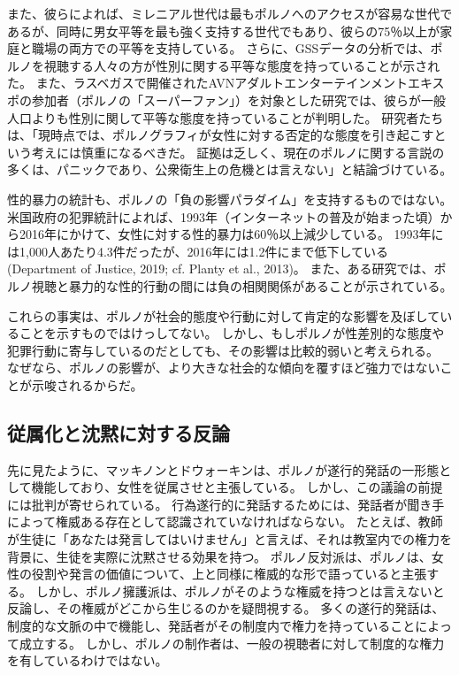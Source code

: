 \documentclass[paper=a4,book,openany]{jlreq}
\begin{document}
また、彼らによれば、ミレニアル世代は最もポルノへのアクセスが容易な世代であるが、同時に男女平等を最も強く支持する世代でもあり、彼らの75％以上が家庭と職場の両方での平等を支持している。
さらに、GSSデータの分析では、ポルノを視聴する人々の方が性別に関する平等な態度を持っていることが示された\citep{taylor16:_is_pornog_reall_makin_hate_women}。
また、ラスベガスで開催されたAVNアダルトエンターテインメントエキスポの参加者（ポルノの「スーパーファン」）を対象とした研究では、彼らが一般人口よりも性別に関して平等な態度を持っていることが判明した\citep{jackson19:_expos_mens_gender_role_attit_porn_super}。
研究者たちは、「現時点では、ポルノグラフィが女性に対する否定的な態度を引き起こすという考えには慎重になるべきだ。
証拠は乏しく、現在のポルノに関する言説の多くは、パニックであり、公衆衛生上の危機とは言えない」と結論づけている\citep{maginn19:_how_male_porn_super_reall_view_women}。

性的暴力の統計も、ポルノの「負の影響パラダイム」を支持するものではない。
米国政府の犯罪統計によれば、1993年（インターネットの普及が始まった頃）から2016年にかけて、女性に対する性的暴力は60％以上減少している。
1993年には1,000人あたり4.3件だったが、2016年には1.2件にまで低下している(Department of Justice, 2019; cf. Planty et al., 2013)。
\nocite{department19:_nation_crime_victim_survey}
また、ある研究では、ポルノ視聴と暴力的な性的行動の間には負の相関関係があることが示されている\citep{ferguson09:_pleas_is_momen}。

これらの事実は、ポルノが社会的態度や行動に対して肯定的な影響を及ぼしていることを示すものではけっしてない。
しかし、もしポルノが性差別的な態度や犯罪行動に寄与しているのだとしても、その影響は比較的弱いと考えられる。
なぜなら、ポルノの影響が、より大きな社会的な傾向を覆すほど強力ではないことが示唆されるからだ。

\subsection{従属化と沈黙に対する反論}

先に見たように、マッキノンとドウォーキンは、ポルノが遂行的発話の一形態として機能しており、女性を従属させと主張している。
しかし、この議論の前提には批判が寄せられている。
行為遂行的に発話するためには、発話者が聞き手によって権威ある存在として認識されていなければならない。
たとえば、教師が生徒に「あなたは発言してはいけません」と言えば、それは教室内での権力を背景に、生徒を実際に沈黙させる効果を持つ。
ポルノ反対派は、ポルノは、女性の役割や発言の価値について、上と同様に権威的な形で語っていると主張する。
しかし、ポルノ擁護派は、ポルノがそのような権威を持つとは言えないと反論し、その権威がどこから生じるのかを疑問視する。
多くの遂行的発話は、制度的な文脈の中で機能し、発話者がその制度内で権力を持っていることによって成立する。
しかし、ポルノの制作者は、一般の視聴者に対して制度的な権力を有しているわけではない。
\end{document}

